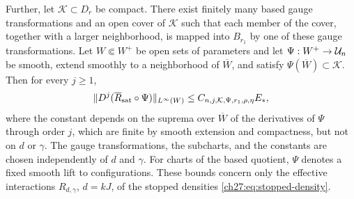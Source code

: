 \begin{lemma}
Further, let $\mathcal K\subset D_r$ be compact. There exist finitely many based gauge transformations and an open cover of $\mathcal K$ such that each member of the cover, together with a larger neighborhood, is mapped into $B_{r_1}$ by one of these gauge transformations. Let $W\Subset W^+$ be open sets of parameters and let $\Psi:W^+\to\mathcal U_{n}$ be smooth, extend smoothly to a neighborhood of $\overline W$, and satisfy $\Psi(\overline W)\subset\mathcal K$. Then for every $j\ge1$,
\begin{equation}\label{ch27:eq:residual-chart-transfer}
 \lVert D^j(\overline R_{\mathrm{sat}}\circ\Psi)\rVert_{L^\infty(W)}\le C_{n,j,\mathcal K,\Psi,r_1,\rho,\eta}E_*,
\end{equation}
where the constant depends on the suprema over $\overline W$ of the derivatives of $\Psi$ through order $j$, which are finite by smooth extension and compactness, but not on $d$ or $\gamma$. The gauge transformations, the subcharts, and the constants are chosen independently of $d$ and $\gamma$. For charts of the based quotient, $\Psi$ denotes a fixed smooth lift to configurations. These bounds concern only the effective interactions $R_{d,\gamma}$, $d=kJ$, of the stopped densities \eqref{ch27:eq:stopped-density}.
\end{lemma}

